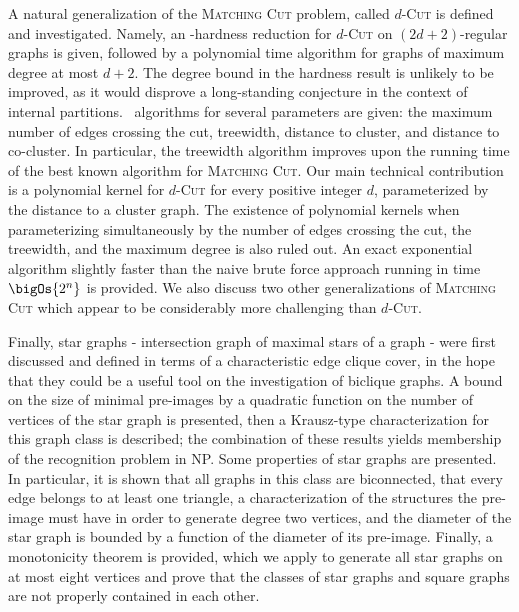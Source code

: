 A natural generalization of the \textsc{Matching Cut} problem, called \textsc{$d$-Cut} is defined and investigated.
Namely, an \NP-hardness reduction for \textsc{$d$-Cut} on $(2d+2)$-regular graphs is given, followed by a polynomial time algorithm for graphs of maximum degree at most $d+2$.
The degree bound in the hardness result is unlikely to be improved, as it would disprove a long-standing conjecture in the context of internal partitions.
\FPT\ algorithms for several parameters are given: the maximum number of edges crossing the cut, treewidth, distance to cluster, and distance to co-cluster.
In particular, the treewidth algorithm improves upon the running time of the best known algorithm for \textsc{Matching Cut}.
Our main technical contribution is a polynomial kernel for \textsc{$d$-Cut} for every positive integer $d$, parameterized by the distance to a cluster graph.
The existence of polynomial kernels when parameterizing simultaneously by the number of edges crossing the cut, the treewidth, and the maximum degree is also ruled out.
An exact exponential algorithm slightly faster than the naive brute force approach running in time $\bigOs{2^n}$ is provided.
We also discuss two other generalizations of \textsc{Matching Cut} which appear to be considerably more challenging than \textsc{$d$-Cut}.

Finally, star graphs - intersection graph of maximal stars of a graph - were first discussed and defined in terms of a characteristic edge clique cover, in the hope that they could be a useful tool on the investigation of biclique graphs.
A bound on the size of minimal pre-images by a quadratic function on the number of vertices of the star graph is presented, then a Krausz-type characterization for this graph class is described; the combination of these results yields membership of the recognition problem in \textsf{NP}.
Some properties of star graphs are presented. In particular, it is shown that all graphs in this class are biconnected, that every edge belongs to at least one triangle, a characterization of the structures the pre-image must have in order to generate degree two vertices, and the diameter of the star graph is bounded by a function of the diameter of its pre-image.
Finally, a monotonicity theorem is provided, which we apply to generate all star graphs on at most eight vertices and prove that the classes of star graphs and square graphs are not properly contained in each other.
